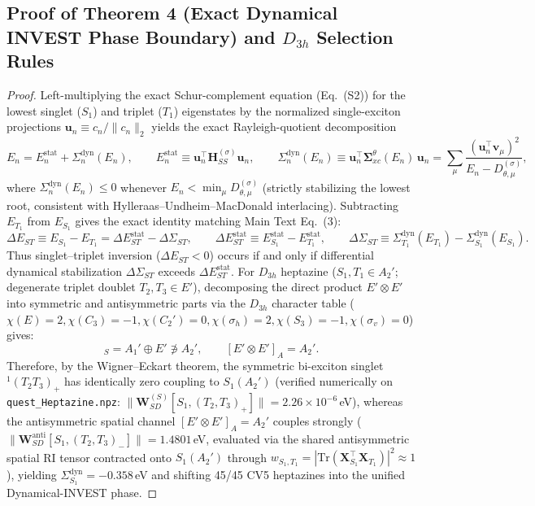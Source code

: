 \documentclass[10pt,a4paper]{article}
\newcommand{\Sig}{\mathbf{\Sigma}_{xc}^\theta}
\newcommand{\dEST}{\Delta E_{ST}}
\newcommand{\dSig}{\Delta\Sigma_{ST}}
\begin{document}
\subsection*{Proof of Theorem 4 (Exact Dynamical INVEST Phase Boundary) and $D_{3h}$ Selection Rules}
\begin{proof}
Left-multiplying the exact Schur-complement equation (Eq.~(S2)) for the lowest singlet ($S_1$) and triplet ($T_1$) eigenstates by the normalized single-exciton projections $\mathbf{u}_n \equiv c_n / \|c_n\|_2$ yields the exact Rayleigh-quotient decomposition
\begin{equation}
E_n = E_n^{\mathrm{stat}} + \Sigma_n^{\mathrm{dyn}}(E_n), \qquad
E_n^{\mathrm{stat}} \equiv \mathbf{u}_n^\top \mathbf{H}_{SS}^{(\sigma)} \mathbf{u}_n, \qquad
\Sigma_n^{\mathrm{dyn}}(E_n) \equiv \mathbf{u}_n^\top \Sig(E_n)\,\mathbf{u}_n = \sum_\mu \frac{(\mathbf{u}_n^\top \mathbf{v}_\mu)^2}{E_n - D_{\theta,\mu}^{(\sigma)}},
\end{equation}
where $\Sigma_n^{\mathrm{dyn}}(E_n) \le 0$ whenever $E_n < \min_\mu D_{\theta,\mu}^{(\sigma)}$ (strictly stabilizing the lowest root, consistent with Hylleraas--Undheim--MacDonald interlacing). Subtracting $E_{T_1}$ from $E_{S_1}$ gives the exact identity matching Main Text Eq.~(3):
\begin{equation}
\dEST \equiv E_{S_1} - E_{T_1} = \dEST^{\mathrm{stat}} - \dSig, \qquad
\dEST^{\mathrm{stat}} \equiv E_{S_1}^{\mathrm{stat}} - E_{T_1}^{\mathrm{stat}}, \qquad
\dSig \equiv \Sigma_{T_1}^{\mathrm{dyn}}(E_{T_1}) - \Sigma_{S_1}^{\mathrm{dyn}}(E_{S_1}).
\end{equation}
Thus singlet--triplet inversion ($\dEST < 0$) occurs if and only if differential dynamical stabilization $\dSig$ exceeds $\dEST^{\mathrm{stat}}$. For $D_{3h}$ heptazine ($S_1, T_1 \in A_2'$; degenerate triplet doublet $T_2, T_3 \in E'$), decomposing the direct product $E'\otimes E'$ into symmetric and antisymmetric parts via the $D_{3h}$ character table ($\chi(E)=2, \chi(C_3)=-1, \chi(C_2')=0, \chi(\sigma_h)=2, \chi(S_3)=-1, \chi(\sigma_v)=0$) gives:
\begin{equation}
[E'\otimes E']_S = A_1' \oplus E' \not\ni A_2', \qquad
[E'\otimes E']_A = A_2'.
\end{equation}
Therefore, by the Wigner--Eckart theorem, the symmetric bi-exciton singlet $^1(T_2 T_3)_+$ has identically zero coupling to $S_1(A_2')$ (verified numerically on \texttt{quest\_Heptazine.npz}: $\|\mathbf{W}_{SD}^{(S)}[S_1,(T_2,T_3)_+]\| = 2.26\times 10^{-6}$\,eV), whereas the antisymmetric spatial channel $[E'\otimes E']_A = A_2'$ couples strongly ($\|\mathbf{W}_{SD}^{\mathrm{anti}}[S_1,(T_2,T_3)_-]\| = 1.4801$\,eV, evaluated via the shared antisymmetric spatial RI tensor contracted onto $S_1(A_2')$ through $w_{S_1,T_1}=|\mathrm{Tr}(\mathbf{X}_{S_1}^\top\mathbf{X}_{T_1})|^2\approx 1$), yielding $\Sigma_{S_1}^{\mathrm{dyn}} = -0.358$\,eV and shifting 45/45 CV5 heptazines into the unified Dynamical-INVEST phase.
\end{proof}
\end{document}
